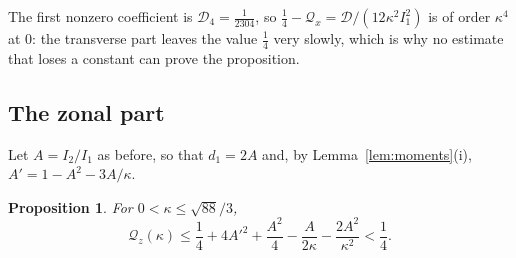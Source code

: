 \documentclass[aps,prd,twocolumn,superscriptaddress,nofootinbib,longbibliography,floatfix,amsmath,amssymb,10pt]{revtex4-2}
\newtheorem{proposition}[theorem]{Proposition}
\theoremstyle{definition}
\theoremstyle{remark}
\begin{document}
The first nonzero coefficient is $\mathcal D_4=\frac1{2304}$, so
$\frac14-\mathcal Q_x=\mathcal D/(12\kappa^2I_1^2)$ is of order $\kappa^4$ at $0$: the transverse part
leaves the value $\frac14$ very slowly, which is why no estimate that loses a
constant can prove the proposition.

\subsection{The zonal part}

Let $A=I_2/I_1$ as before, so that $d_1=2A$ and, by
Lemma~\ref{lem:moments}(i), $A'=1-A^2-3A/\kappa$.

\begin{proposition}\label{prop:zonal}
For $0<\kappa\le\sqrt{88}/3$,
\[
\mathcal Q_z(\kappa)\le\frac14+4A'^2+\frac{A^2}4-\frac A{2\kappa}-
\frac{2A^2}{\kappa^2}<\frac14 .
\]
\end{proposition}
\end{document}
